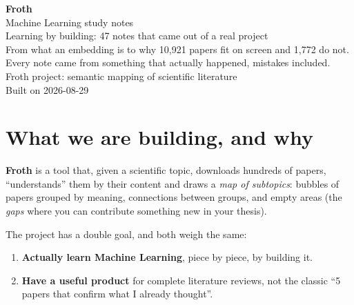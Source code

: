 \documentclass[11pt,a4paper]{article}
\begin{document}
\begin{titlepage}
\centering
\vspace*{3cm}
{\Huge\bfseries\color{litblue} Froth}\\[6pt]
{\Large\color{litblue} Machine Learning study notes}\\[2cm]
{\large Learning by building: 47 notes that came out of a real project}\\[1cm]
{\normalsize From what an embedding is to why 10,921 papers fit on screen and 1,772 do not.\\
Every note came from something that actually happened, mistakes included.}\\[2cm]
{\small\color{litblue} Froth project: semantic mapping of scientific literature}\\[4pt]
{\small Built on 2026-08-29}
\vfill
\end{titlepage}
\tableofcontents
\clearpage

{}

\section{What we are building, and why}

\textbf{Froth} is a tool that, given a scientific topic, downloads hundreds of papers,
``understands'' them by their content and draws a \emph{map of subtopics}: bubbles of
papers grouped by meaning, connections between groups, and empty areas (the \emph{gaps}
where you can contribute something new in your thesis).

The project has a double goal, and both weigh the same:
\begin{enumerate}
  \item \textbf{Actually learn Machine Learning}, piece by piece, by building it.
  \item \textbf{Have a useful product} for complete literature reviews, not the classic
        ``5 papers that confirm what I already thought''.
\end{enumerate}
\end{document}
